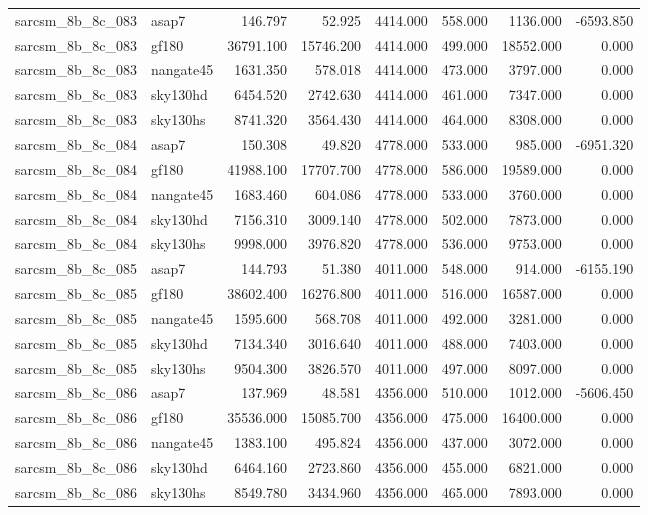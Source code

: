 \begin{tabular}{llrrrrrr}
sarcsm\_8b\_8c\_083 & asap7 & 146.797 & 52.925 & 4414.000 & 558.000 & 1136.000 & -6593.850 \\
sarcsm\_8b\_8c\_083 & gf180 & 36791.100 & 15746.200 & 4414.000 & 499.000 & 18552.000 & 0.000 \\
sarcsm\_8b\_8c\_083 & nangate45 & 1631.350 & 578.018 & 4414.000 & 473.000 & 3797.000 & 0.000 \\
sarcsm\_8b\_8c\_083 & sky130hd & 6454.520 & 2742.630 & 4414.000 & 461.000 & 7347.000 & 0.000 \\
sarcsm\_8b\_8c\_083 & sky130hs & 8741.320 & 3564.430 & 4414.000 & 464.000 & 8308.000 & 0.000 \\
sarcsm\_8b\_8c\_084 & asap7 & 150.308 & 49.820 & 4778.000 & 533.000 & 985.000 & -6951.320 \\
sarcsm\_8b\_8c\_084 & gf180 & 41988.100 & 17707.700 & 4778.000 & 586.000 & 19589.000 & 0.000 \\
sarcsm\_8b\_8c\_084 & nangate45 & 1683.460 & 604.086 & 4778.000 & 533.000 & 3760.000 & 0.000 \\
sarcsm\_8b\_8c\_084 & sky130hd & 7156.310 & 3009.140 & 4778.000 & 502.000 & 7873.000 & 0.000 \\
sarcsm\_8b\_8c\_084 & sky130hs & 9998.000 & 3976.820 & 4778.000 & 536.000 & 9753.000 & 0.000 \\
sarcsm\_8b\_8c\_085 & asap7 & 144.793 & 51.380 & 4011.000 & 548.000 & 914.000 & -6155.190 \\
sarcsm\_8b\_8c\_085 & gf180 & 38602.400 & 16276.800 & 4011.000 & 516.000 & 16587.000 & 0.000 \\
sarcsm\_8b\_8c\_085 & nangate45 & 1595.600 & 568.708 & 4011.000 & 492.000 & 3281.000 & 0.000 \\
sarcsm\_8b\_8c\_085 & sky130hd & 7134.340 & 3016.640 & 4011.000 & 488.000 & 7403.000 & 0.000 \\
sarcsm\_8b\_8c\_085 & sky130hs & 9504.300 & 3826.570 & 4011.000 & 497.000 & 8097.000 & 0.000 \\
sarcsm\_8b\_8c\_086 & asap7 & 137.969 & 48.581 & 4356.000 & 510.000 & 1012.000 & -5606.450 \\
sarcsm\_8b\_8c\_086 & gf180 & 35536.000 & 15085.700 & 4356.000 & 475.000 & 16400.000 & 0.000 \\
sarcsm\_8b\_8c\_086 & nangate45 & 1383.100 & 495.824 & 4356.000 & 437.000 & 3072.000 & 0.000 \\
sarcsm\_8b\_8c\_086 & sky130hd & 6464.160 & 2723.860 & 4356.000 & 455.000 & 6821.000 & 0.000 \\
sarcsm\_8b\_8c\_086 & sky130hs & 8549.780 & 3434.960 & 4356.000 & 465.000 & 7893.000 & 0.000 \\

\end{tabular}

